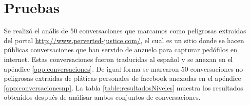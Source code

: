 	
\section{Pruebas}

Se realiz\'o el an\'alis de 50 conversaciones que marcamos como peligrosas extraidas del portal \url{http://www.perverted-justice.com/}, el cual es un sitio donde se hacen p\'ublicas conversaciones que han servido de anzuelo para capturar ped\'ofilos en internet. Estas conversaciones fueron traducidas al espa\~nol y se anexan en el ap\'endice \ref{app:conversaciones}. De igual forma se marcaron 50 conversaciones no peligrosas extraidas de pl\'aticas personales de facebook anexadas en el ap\'endice \ref{app:conversacionesnp}. La tabla \ref{table:resultadosNiveles} muestra los resultados obtenidos despu\'es de an\'alisar ambos conjuntos de conversaciones.



